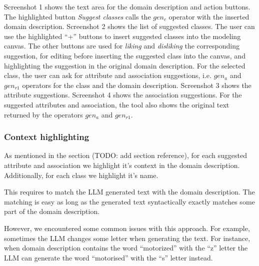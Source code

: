 Screenshot 1 shows the text area for the domain description and action buttons. The highlighted button \textit{Suggest classes} calls the $gen_c$ operator with the inserted domain description. Screenshot 2 shows the list of suggested classes. The user can use the highlighted ``+'' buttons to insert suggested classes into the modeling canvas. The other buttons are used for \textit{liking} and \textit{disliking} the corresponding suggestion, for editing before inserting the suggested class into the canvas, and highlighting the suggestion in the original domain description. For the selected class, the user can ask for attribute and association suggestions, i.e. $gen_a$ and $gen_{r1}$ operators for the class and the domain description. Screenshot 3 shows the attribute suggestions. Screenshot 4 shows the association suggestions. For the suggested attributes and association, the tool also shows the original text returned by the operators $gen_a$ and $gen_{r1}$.


\subsubsection{Context highlighting}

As mentioned in the section (TODO: add section reference), for each suggested attribute and association we highlight it's context in the domain description. Additionally, for each class we highlight it's name.

This requires to match the LLM generated text with the domain description. The matching is easy as long as the generated text syntactically exactly matches some part of the domain description. %




However, we encountered some common issues with this approach. For example, sometimes the LLM changes some letter when generating the text. For instance, when domain description contains the word ``motorized'' with the ``z'' letter the LLM can generate the word ``motorised'' with the ``s'' letter instead.

